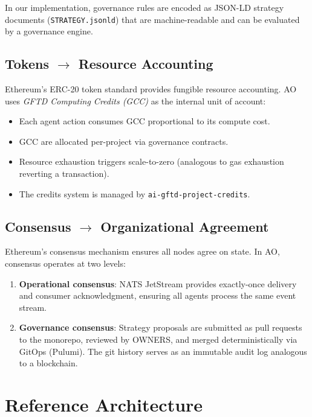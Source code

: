 \documentclass[11pt,a4paper]{article}
\begin{document}
In our implementation, governance rules are encoded as JSON-LD strategy
documents (\texttt{STRATEGY.jsonld}) that are machine-readable and can be
evaluated by a governance engine.

\subsection{Tokens $\rightarrow$ Resource Accounting}

Ethereum's ERC-20 token standard provides fungible resource accounting. AO
uses \emph{GFTD Computing Credits (GCC)} as the internal unit of account:

\begin{itemize}[nosep]
  \item Each agent action consumes GCC proportional to its compute cost.
  \item GCC are allocated per-project via governance contracts.
  \item Resource exhaustion triggers scale-to-zero (analogous to gas exhaustion
    reverting a transaction).
  \item The credits system is managed by \texttt{ai-gftd-project-credits}.
\end{itemize}

\subsection{Consensus $\rightarrow$ Organizational Agreement}

Ethereum's consensus mechanism ensures all nodes agree on state. In AO,
consensus operates at two levels:

\begin{enumerate}[nosep]
  \item \textbf{Operational consensus}: NATS JetStream provides exactly-once
    delivery and consumer acknowledgment, ensuring all agents process the
    same event stream.
  \item \textbf{Governance consensus}: Strategy proposals are submitted as
    pull requests to the monorepo, reviewed by OWNERS, and merged
    deterministically via GitOps (Pulumi). The git history serves as an
    immutable audit log analogous to a blockchain.
\end{enumerate}

\section{Reference Architecture}
\end{document}
